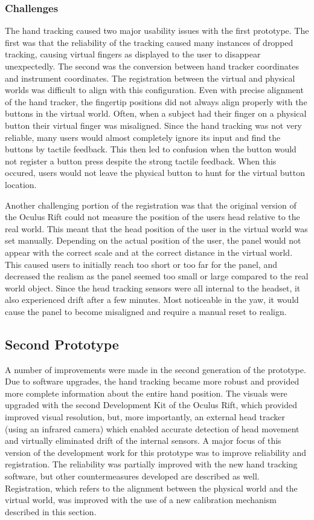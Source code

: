 \subsubsection{Challenges}

The hand tracking caused two major usability issues with the first prototype.
The first was that the reliability of the tracking caused many instances of dropped tracking, causing virtual fingers as displayed to the user to disappear unexpectedly.
The second was the conversion between hand tracker coordinates and instrument coordinates.
The registration between the virtual and physical worlds was difficult to align with this configuration.
Even with precise alignment of the hand tracker, the fingertip positions did not always align properly with the buttons in the virtual world.
Often, when a subject had their finger on a physical button their virtual finger was misaligned.
Since the hand tracking was not very reliable, many users would almost completely ignore its input and find the buttons by tactile feedback.
This then led to confusion when the button would not register a button press despite the strong tactile feedback.
When this occured, users would not leave the physical button to hunt for the virtual button location.

Another challenging portion of the registration was that the original version of the Oculus Rift could not measure the position of the users head relative to the real world.
This meant that the head position of the user in the virtual world was set manually.
Depending on the actual position of the user, the panel would not appear with the correct scale and at the correct distance in the virtual world.
This caused users to initially reach too short or too far for the panel, and decreased the realism as the panel seemed too small or large compared to the real world object.
Since the head tracking sensors were all internal to the headset, it also experienced drift after a few minutes.
Most noticeable in the yaw, it would cause the panel to become misaligned and require a manual reset to realign.

\subsection{Second Prototype}

A number of improvements were made in the second generation of the prototype.
Due to software upgrades, the hand tracking became more robust and provided more complete information about the entire hand position.
The visuals were upgraded with the second Development Kit of the Oculus Rift, which provided improved visual resolution, but, more importantly, an external head tracker (using an infrared camera) which enabled accurate detection of head movement and virtually eliminated drift of the internal sensors.
A major focus of this version of the development work for this prototype was to improve reliability and registration.
The reliability was partially improved with the new hand tracking software, but other countermeasures developed are described as well.
Registration, which refers to the alignment between the physical world and the virtual world, was improved with the use of a new calibration mechanism described in this section.

